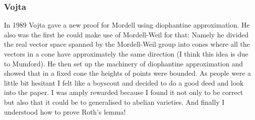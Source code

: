 \documentclass{beamer}
\begin{document}
\begin{frame}
\frametitle{Vojta}
 In 1989 Vojta gave a new proof for Mordell using diophantine approximation. He also was the first he could make use of Mordell-Weil for that: Namely he divided the real vector space spanned by the Mordell-Weil group into cones where all the vectors in a cone have approximately the same direction (I think this idea is due to Mumford). He then set up the machinery of diophantine approximation and showed that in a fixed cone the heights of points were bounded. As people were a little bit hesitant I felt like a boyscout and decided to do a good deed and look into the paper. I was amply rewarded because I found it not only to be correct but also that it could be to generalised to abelian varieties. And finally I understood how to prove Roth's lemma!
\end{frame}
\end{document}
